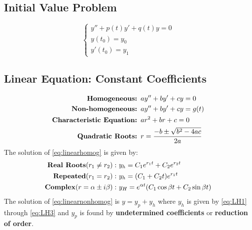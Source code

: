 \documentclass[10pt,portrait, leqno]{article}
\begin{document}
\begin{multicols}{2}
\subsection*{Initial Value Problem}
\begin{equation}
\left\{
\begin{array}{l}
y''+p(t)y'+q(t)y=0\\ y(t_0)=y_0 \\ y'(t_0)=y_1
\end{array} 
\right.
\end{equation}



\subsection*{Linear Equation: Constant Coefficients} 
\begin{align}
\text{\textbf{Homogeneous: }} &ay'' + by' + cy=0 \label{eq:linearhomog}\\
\text{\textbf{Non-homogeneous: }} &ay''+by'+cy = g(t)\label{eq:linearnonhomog}\\
\text{\textbf{Characteristic Equation: }} &ar^2 + br + c=0\\
\text{\textbf{Quadratic Roots: }} &r=\frac{-b\pm\sqrt{b^2-4ac}}{2a}
\end{align}
The solution of \eqref{eq:linearhomog} is given by: 
\begin{align}
\text{\textbf{Real Roots}} (r_1 \neq r_2):\  & y_h = C_1 e^{r_1 t} + C_2 e^{r_2t} \label{eq:LH1}\\
\text{\textbf{Repeated}} (r_1 = r_2):\  & y_h = (C_1 + C_2 t)e^{r_1t}\label{eq:LH2}\\
\text{\textbf{Complex}} (r=\alpha\pm i\beta):\ & y_H=e^{\alpha t}(C_1 \cos \beta t + C_2 \sin \beta t) \label{eq:LH3}
\end{align}
The solution of \eqref{eq:linearnonhomog} is $y=y_p+y_h$ where $y_h$ is given by \eqref{eq:LH1} through \eqref{eq:LH3} and $y_p$ is found by \textbf{undetermined coefficients} or \textbf{reduction of order}.



\end{multicols}
\end{document}
